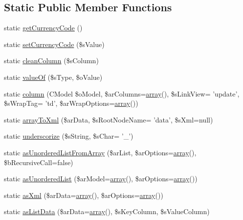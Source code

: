 \subsection*{Static Public Member Functions}
\begin{DoxyCompactItemize}
\item 
static \hyperlink{classCPSTransform_aaba192253f94bbad45870587c5a6cf47}{getCurrencyCode} ()
\item 
static \hyperlink{classCPSTransform_a326aa5ab4d2acd64a6d1ceb91ada10a9}{setCurrencyCode} (\$sValue)
\item 
static \hyperlink{classCPSTransform_aa255554fc788af56211439af1c7d537f}{cleanColumn} (\$sColumn)
\item 
static \hyperlink{classCPSTransform_adaa9f9a55104660a4b1eb1cd4a7516fa}{valueOf} (\$sType, \$oValue)
\item 
static \hyperlink{classCPSTransform_aeabce54d5af0d17071617701b870308f}{column} (CModel \$oModel, \$arColumns=\hyperlink{list_8php_aa3205d038c7f8feb5c9f01ac4dfadc88}{array}(), \$sLinkView= 'update', \$sWrapTag= 'td', \$arWrapOptions=\hyperlink{list_8php_aa3205d038c7f8feb5c9f01ac4dfadc88}{array}())
\item 
static \hyperlink{classCPSTransform_afb9fa6864edba1cdfc91092132bc1da3}{arrayToXml} (\$arData, \$sRootNodeName= 'data', \$sXml=null)
\item 
static \hyperlink{classCPSTransform_a47574be513de930ec832fce1062dd033}{underscorize} (\$sString, \$sChar= '\_\-')
\item 
static \hyperlink{classCPSTransform_a4260063eeb39947020f6d4ccb7e206e0}{asUnorderedListFromArray} (\$arList, \$arOptions=\hyperlink{list_8php_aa3205d038c7f8feb5c9f01ac4dfadc88}{array}(), \$bRecursiveCall=false)
\item 
static \hyperlink{classCPSTransform_adccbddee16965574f2d40fdd059a9d00}{asUnorderedList} (\$arModel=\hyperlink{list_8php_aa3205d038c7f8feb5c9f01ac4dfadc88}{array}(), \$arOptions=\hyperlink{list_8php_aa3205d038c7f8feb5c9f01ac4dfadc88}{array}())
\item 
static \hyperlink{classCPSTransform_ad4d5a2bf97cacd382d3019fbbc21a399}{asXml} (\$arData=\hyperlink{list_8php_aa3205d038c7f8feb5c9f01ac4dfadc88}{array}(), \$arOptions=\hyperlink{list_8php_aa3205d038c7f8feb5c9f01ac4dfadc88}{array}())
\item 
static \hyperlink{classCPSTransform_abc34bb044b9ae8653f4bdef6f64d7d0c}{asListData} (\$arData=\hyperlink{list_8php_aa3205d038c7f8feb5c9f01ac4dfadc88}{array}(), \$sKeyColumn, \$sValueColumn)
\end{DoxyCompactItemize}
